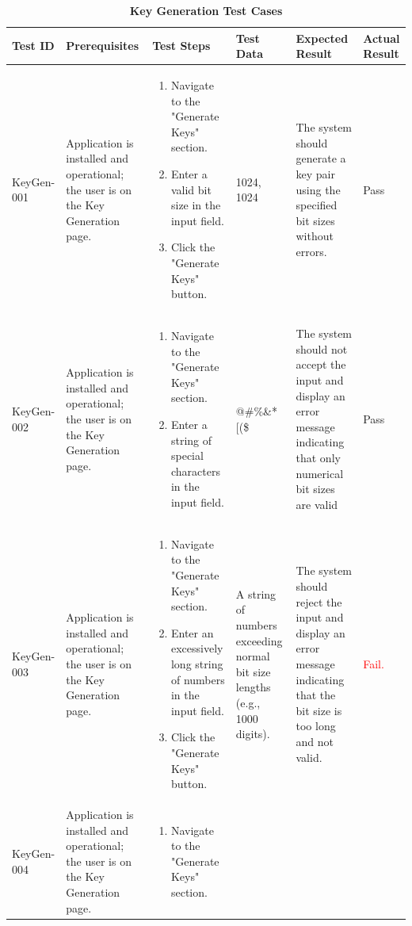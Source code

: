\documentclass[]{final_report}
\theoremstyle{definition}
\begin{document}
\begin{longtable}{|l|p{2.5cm}|p{2.5cm}|p{2.5cm}|p{2.5cm}|p{3cm}|}
  \caption{\textbf{Key Generation Test Cases}}
  \hline
  \textbf{Test ID} & \textbf{Prerequisites} & \textbf{Test Steps} & \textbf{Test Data} & \textbf{Expected Result} & \textbf{Actual Result} \\
  \hline
  KeyGen-001 & Application is installed and operational; the user is on the Key Generation page. & 
  \begin{enumerate}
  \item Navigate to the "Generate Keys" section.
  \item Enter a valid bit size in the input field.
  \item Click the "Generate Keys" button.
  \end{enumerate} & 1024, 1024 & The system should generate a key pair using the specified bit sizes without errors. & Pass \\
  \hline
  KeyGen-002 & Application is installed and operational; the user is on the Key Generation page. & 
  \begin{enumerate}
  \item Navigate to the "Generate Keys" section.
  \item Enter a string of special characters in the input field.
  \end{enumerate} & @\#\%\&*[(\$ & The system should not accept the input and display an error message indicating that only numerical bit sizes are valid & Pass \\
  \hline
  KeyGen-003 & Application is installed and operational; the user is on the Key Generation page. & 
  \begin{enumerate}
  \item Navigate to the "Generate Keys" section.
  \item Enter an excessively long string of numbers in the input field.
  \item Click the "Generate Keys" button.
  \end{enumerate} & A string of numbers exceeding normal bit size lengths (e.g., 1000 digits). & The system should reject the input and display an error message indicating that the bit size is too long and not valid. & \textcolor{red}{Fail.} \\
  \hline
  KeyGen-004 & Application is installed and operational; the user is on the Key Generation page. & 
  \begin{enumerate}
  \item Navigate to the "Generate Keys" section.

\end{enumerate}
\end{longtable}
\end{document}
